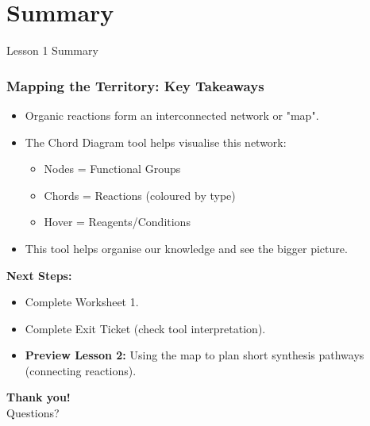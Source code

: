 \documentclass[xcolor=svgnames]{beamer}
\begin{document}
\section{Summary}
\begin{frame}{Lesson 1 Summary}
    \frametitle{Mapping the Territory: Key Takeaways}
    \begin{itemize}
        \item Organic reactions form an interconnected network or "map".
        \item The Chord Diagram tool helps visualise this network:
            \begin{itemize}
                \item Nodes = Functional Groups
                \item Chords = Reactions (coloured by type)
                \item Hover = Reagents/Conditions
            \end{itemize}
        \item This tool helps organise our knowledge and see the bigger picture.
    \end{itemize}
    \vspace{1em}
    \textbf{Next Steps:}
    \begin{itemize}
        \item Complete Worksheet 1.
        \item Complete Exit Ticket (check tool interpretation).
        \item \textbf{Preview Lesson 2:} Using the map to plan short synthesis pathways (connecting reactions).
    \end{itemize}
\end{frame}

\begin{frame}
    \centering
    \textbf{Thank you!}\\ \vspace{1em} Questions?
\end{frame}
\end{document}

